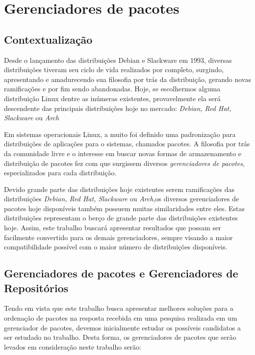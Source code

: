 \section{Gerenciadores de pacotes} %
\label{sec:distribui_es_abordadas}

\subsection{Contextualização} %
\label{sec:breve_descri_o}

Desde o lançamento das distribuições Debian e Slackware em 1993, diversas distribuições tiveram seu ciclo de vida realizados por completo, surgindo, apresentando e amadurecendo sua filosofia por trás da distribuição, gerando novas ramificações e por fim sendo abandonadas. Hoje, se escolhermos alguma distribuição Linux dentre as inúmeras existentes, provavelmente ela será descendente das principais distribuições hoje no mercado: \textit{Debian, Red Hat, Slackware} ou \textit{Arch}

Em sistemas operacionais Linux, a muito foi definido uma padronização para distribuições de aplicações para o sistemas, chamados pacotes. A filosofia por trás da comunidade livre e o interesse em buscar novas formas de armazenamento e distribuição de pacotes fez com que surgissem diversos \textit{gerenciadores de pacotes}, especializados para cada distribuição.

Devido grande parte das distribuições hoje existentes serem ramificações das distribuições \textit{Debian, Red Hat, Slackware} ou \textit{Arch},os diversos gerenciadores de pacotes hoje disponíveis também possuem muitas similaridades entre eles.
Estas distribuições representam o berço de grande parte das distribuições existentes hoje. Assim, este trabalho buscará apresentar resultados que possam ser facilmente convertido para os demais gerenciadores, sempre visando a maior compatibilidade possível com o maior número de distribuições disponíveis.

\subsection{Gerenciadores de pacotes e Gerenciadores de Repositórios} %
\label{sec:gerenciadores}


Tendo em vista que este trabalho busca apresentar melhores soluções para a ordenação de pacotes na resposta recebida em uma pesquisa realizada em um gerenciador de pacotes, devemos inicialmente estudar os possíveis candidatos a ser estudado no trabalho.
Desta forma, os gerenciadores de pacotes que serão levados em consideração neste trabalho serão:

